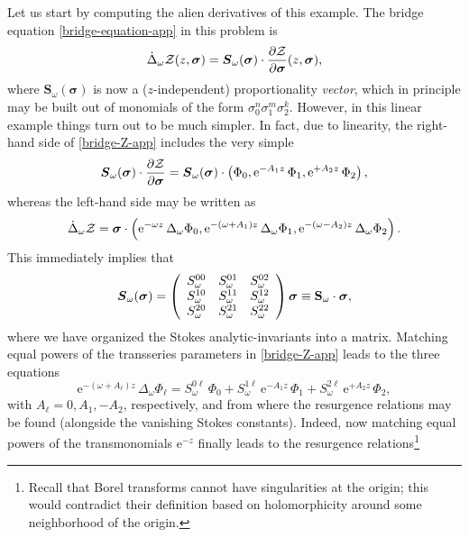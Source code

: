 \documentclass[11pt,a4paper]{article}
\newcommand{\CZ}{{\cal Z}}
\newcommand{\be}{\begin{equation}}
\newcommand{\ee}{\end{equation}}
\newcommand{\rme}{{\mathrm{e}}}
\begin{document}
Let us start by computing the alien derivatives of this example. The bridge equation \eqref{bridge-equation-app} in this problem is
%
\be
\label{bridge-Z-app}
\dot{\Delta}_\omega \CZ (z, \boldsymbol{\sigma}) = \boldsymbol{S}_\omega (\boldsymbol{\sigma}) \cdot \frac{\partial\CZ}{\partial\boldsymbol{\sigma}} (z,\boldsymbol{\sigma}),
\ee
%
\noindent
where $\boldsymbol{S}_\omega (\boldsymbol{\sigma})$ is now a ($z$-independent) proportionality \textit{vector}, which in principle may be built out of monomials of the form $\sigma_0^n \sigma_1^m \sigma_2^k$. However, in this linear example things turn out to be much simpler. In fact, due to linearity, the right-hand side of \eqref{bridge-Z-app} includes the very simple
%
\be
\boldsymbol{S}_\omega (\boldsymbol{\sigma}) \cdot \frac{\partial\CZ}{\partial\boldsymbol{\sigma}} = \boldsymbol{S}_\omega (\boldsymbol{\sigma}) \cdot \left( \Phi_0, \rme^{-A_1 z}\, \Phi_1, \rme^{+A_2 z}\, \Phi_2 \right),
\ee
%
\noindent
whereas the left-hand side may be written as
%
\be
\dot{\Delta}_\omega \CZ = \boldsymbol{\sigma} \cdot \left( \rme^{-\omega z}\, \Delta_\omega \Phi_0, \rme^{- \left( \omega+A_1 \right) z}\, \Delta_\omega \Phi_1, \rme^{- \left( \omega-A_2 \right) z}\, \Delta_\omega \Phi_2 \right).
\ee
%
\noindent
This immediately implies that
%
\be
\boldsymbol{S}_\omega (\boldsymbol{\sigma}) = \left(
\begin{array}{ccc}
S_\omega^{00} & S_\omega^{01} & S_\omega^{02} \\
S_\omega^{10} & S_\omega^{11} & S_\omega^{12} \\
S_\omega^{20} & S_\omega^{21} & S_\omega^{22}
\end{array}
\right) \boldsymbol{\sigma} \equiv \text{\textbf{S}}_\omega \cdot \boldsymbol{\sigma},
\ee
%
\noindent
where we have organized the Stokes analytic-invariants into a matrix. Matching equal powers of the transseries parameters in \eqref{bridge-Z-app} leads to the three equations
%
\be
\rme^{- \left( \omega+A_\ell \right) z}\, \Delta_\omega \Phi_\ell = S_\omega^{0\ell}\, \Phi_0 + S_\omega^{1\ell}\, \rme^{-A_1 z}\, \Phi_1 + S_\omega^{2\ell}\, \rme^{+A_2 z}\, \Phi_2,
\ee
%
\noindent
with $A_\ell = 0, A_1, -A_2$, respectively, and from where the resurgence relations may be found (alongside the vanishing Stokes constants). Indeed, now matching equal powers of the transmonomials $\rme^{-z}$ finally leads to the resurgence relations\footnote{Recall that Borel transforms cannot have singularities at the origin; this would contradict their definition based on holomorphicity around some neighborhood of the origin.}
\end{document}
